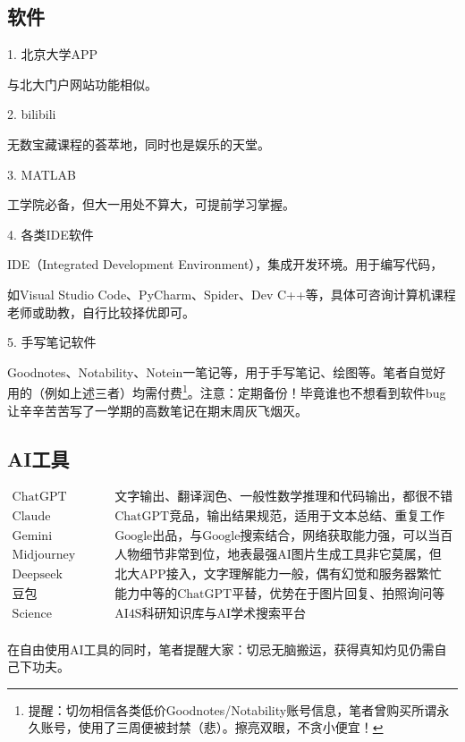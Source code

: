\documentclass[11pt,oneside]{book}
\begin{document}
\subsection{软件}

1. 北京大学APP

与北大门户网站功能相似。

2. bilibili

无数宝藏课程的荟萃地，同时也是娱乐的天堂。

3. MATLAB

工学院必备，但大一用处不算大，可提前学习掌握。

4. 各类IDE软件

IDE（Integrated Development Environment），集成开发环境。用于编写代码，

如Visual Studio Code、PyCharm、Spider、Dev C++等，具体可咨询计算机课程老师或助教，自行比较择优即可。

5. 手写笔记软件

Goodnotes、Notability、Notein一笔记等，用于手写笔记、绘图等。笔者自觉好用的（例如上述三者）均需付费\footnote{提醒：切勿相信各类低价Goodnotes/Notability账号信息，笔者曾购买所谓永久账号，使用了三周便被封禁（悲）。擦亮双眼，不贪小便宜！}。注意：定期备份！毕竟谁也不想看到软件bug让辛辛苦苦写了一学期的高数笔记在期末周灰飞烟灭。

\subsection{AI工具}

\[
\begin{matrix}
	\text{ChatGPT} & \text{文字输出、翻译润色、一般性数学推理和代码输出，都很不错}\\
	\text{Claude} & \text{ChatGPT竞品，输出结果规范，适用于文本总结、重复工作等}\\
	\text{Gemini} & \text{Google出品，与Google搜索结合，网络获取能力强，可以当百度用}\\
	\text{Midjourney} & \text{人物细节非常到位，地表最强AI图片生成工具非它莫属，但收费（悲）}\\
	\text{Deepseek} & \text{北大APP接入，文字理解能力一般，偶有幻觉和服务器繁忙}\\
	\text{豆包} & \text{能力中等的ChatGPT平替，优势在于图片回复、拍照询问等功能无限制}\\
	\text{Science Navigator} & \text{AI4S科研知识库与AI学术搜索平台}\\
\end{matrix}
\]

在自由使用AI工具的同时，笔者提醒大家：切忌无脑搬运，获得真知灼见仍需自己下功夫。
\end{document}
